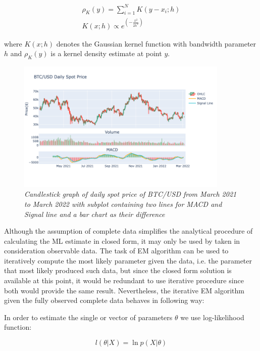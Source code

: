 \begin{gather} 
\rho_K(y) = \sum_{i=1}^{N} K(y - x_i;h)  \\
K(x;h) \propto e^{(-\frac{x^2}{2h^2})}
\end{gather}

where $K(x;h)$ denotes the Gaussian kernel function with bandwidth parameter $h$ and $\rho_K(y)$ is a kernel density estimate at point $y$.

\begin{figure}[h]

\begin{center}
	\includegraphics[width=0.9\textwidth]{MACD.png}
\end{center}

\caption{\textit{ Candlestick graph of daily spot price of BTC/USD from March 2021 to March 2022 with subplot containing two lines for MACD and Signal line and a bar chart as their difference}}

\end{figure}

Although the assumption of complete data simplifies the analytical procedure of calculating the ML estimate in closed form, it may only be used by taken in consideration observable data. The task of EM algorithm can be used to iteratively compute the most likely parameter given the data, i.e. the parameter that most likely produced such data, but since the closed form solution is available at this point, it would be redundant to use iterative procedure since both would provide the same result. Nevertheless, the iterative EM algorithm given the fully observed complete data behaves in following way:

In order to estimate the single or vector of parameters $\theta$ we use log-likelihood function:

\begin{equation}
l(\theta|X) = \ln p(X|\theta) 
\end{equation}

